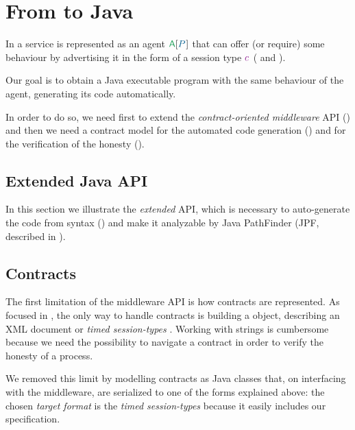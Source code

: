 \section{From \coco to Java}\label{sec:co2-to-java}


In \coco a service is represented as an agent $\sys{\pmv{A}}{\procP}$ that can offer (or require) some behaviour by advertising it in the form of a session type $\contrP$ ( and ).

Our goal is to obtain a Java executable program with the same behaviour of the \coco agent, generating its code automatically.

In order to do so, we need first to extend the \textit{contract-oriented middleware} API () and then we need a contract model for the automated code generation () and for the verification of the honesty ().



\subsection*{Extended \coco Java API}\label{sec:extended-api}
In this section we illustrate the \textit{extended} API, which is necessary to auto-generate the code from \coco syntax () and make it analyzable by Java PathFinder (JPF, described in ).


\subsection{Contracts}\label{sec:java-contracts-model}
The first limitation of the middleware API is how contracts are represented. As focused in , the only way to handle contracts is building a  object, describing an XML document or \textit{timed session-types} \cite{Bartoletti15forte}. Working with strings is cumbersome because we need the possibility to navigate a contract in order to verify the honesty of a process.

We removed this limit by modelling contracts as Java classes that, on interfacing with the middleware, are serialized to one of the forms explained above: the chosen \textit{target format} is  the \textit{timed session-types} because it easily includes our specification.

